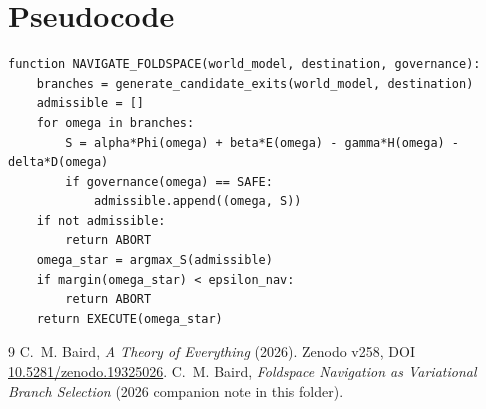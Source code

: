 \documentclass[11pt]{article}
\begin{document}
\section{Pseudocode}
\begin{verbatim}
function NAVIGATE_FOLDSPACE(world_model, destination, governance):
    branches = generate_candidate_exits(world_model, destination)
    admissible = []
    for omega in branches:
        S = alpha*Phi(omega) + beta*E(omega) - gamma*H(omega) - delta*D(omega)
        if governance(omega) == SAFE:
            admissible.append((omega, S))
    if not admissible:
        return ABORT
    omega_star = argmax_S(admissible)
    if margin(omega_star) < epsilon_nav:
        return ABORT
    return EXECUTE(omega_star)
\end{verbatim}

\begin{thebibliography}{9}
C.\ M. Baird, \emph{A Theory of Everything} (2026). Zenodo v258, DOI \href{https://doi.org/10.5281/zenodo.19325026}{10.5281/zenodo.19325026}.
C.\ M. Baird, \emph{Foldspace Navigation as Variational Branch Selection} (2026 companion note in this folder).
\end{thebibliography}
\end{document}
